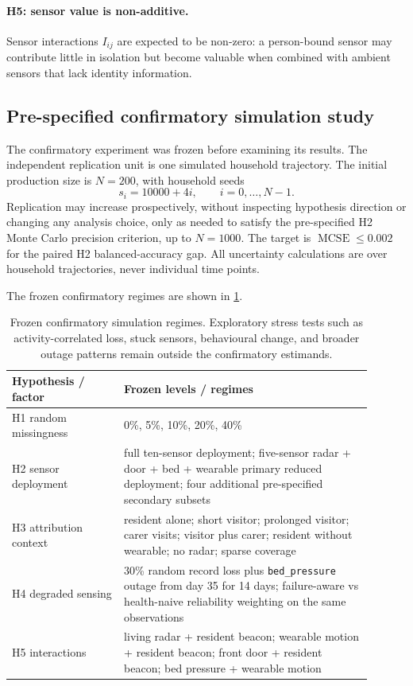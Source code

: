 \documentclass[11pt]{article}
\begin{document}
\paragraph{H5: sensor value is non-additive.}
Sensor interactions $I_{ij}$ are expected to be non-zero: a person-bound sensor may contribute little in isolation but become valuable when combined with ambient sensors that lack identity information.

\subsection{Pre-specified confirmatory simulation study}
\label{sec:confirmatory}

The confirmatory experiment was frozen before examining its results. The independent replication unit is one simulated household trajectory. The initial production size is $N=200$, with household seeds
\begin{equation}
s_i=10000+4i,\qquad i=0,\ldots,N-1.
\end{equation}
Replication may increase prospectively, without inspecting hypothesis direction or changing any analysis choice, only as needed to satisfy the pre-specified H2 Monte Carlo precision criterion, up to $N=1000$. The target is $\operatorname{MCSE}\leq 0.002$ for the paired H2 balanced-accuracy gap. All uncertainty calculations are over household trajectories, never individual time points.

The frozen confirmatory regimes are shown in \cref{tab:design}.

\begin{table}[t]
\centering
\caption{Frozen confirmatory simulation regimes. Exploratory stress tests such as activity-correlated loss, stuck sensors, behavioural change, and broader outage patterns remain outside the confirmatory estimands.}
\label{tab:design}
\begin{tabular}{p{0.28\linewidth}p{0.62\linewidth}}
\toprule
Hypothesis / factor & Frozen levels / regimes \\
\midrule
H1 random missingness & 0\%, 5\%, 10\%, 20\%, 40\% \\
H2 sensor deployment & full ten-sensor deployment; five-sensor radar + door + bed + wearable primary reduced deployment; four additional pre-specified secondary subsets \\
H3 attribution context & resident alone; short visitor; prolonged visitor; carer visits; visitor plus carer; resident without wearable; no radar; sparse coverage \\
H4 degraded sensing & 30\% random record loss plus \texttt{bed\_pressure} outage from day 35 for 14 days; failure-aware vs health-naive reliability weighting on the same observations \\
H5 interactions & living radar + resident beacon; wearable motion + resident beacon; front door + resident beacon; bed pressure + wearable motion \\
\bottomrule
\end{tabular}
\end{table}
\end{document}
